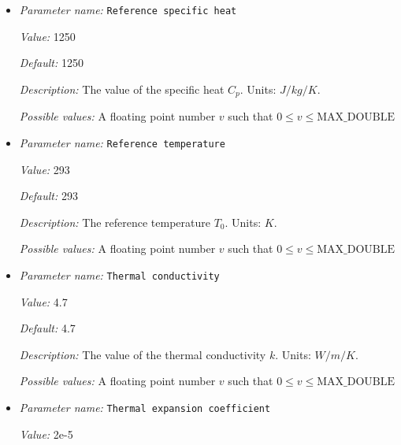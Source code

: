 \begin{itemize}
{\it Default:} 3300


{\it Description:} Reference density $\rho_0$. Units: $kg/m^3$.


{\it Possible values:} A floating point number $v$ such that $0 \leq v \leq \text{MAX\_DOUBLE}$
\item {\it Parameter name:} {\tt Reference specific heat}
\label{parameters:Material model/Composition reaction model/Reference specific heat}


{\it Value:} 1250


{\it Default:} 1250


{\it Description:} The value of the specific heat $C_p$. Units: $J/kg/K$.


{\it Possible values:} A floating point number $v$ such that $0 \leq v \leq \text{MAX\_DOUBLE}$
\item {\it Parameter name:} {\tt Reference temperature}
\label{parameters:Material model/Composition reaction model/Reference temperature}


{\it Value:} 293


{\it Default:} 293


{\it Description:} The reference temperature $T_0$. Units: $K$.


{\it Possible values:} A floating point number $v$ such that $0 \leq v \leq \text{MAX\_DOUBLE}$
\item {\it Parameter name:} {\tt Thermal conductivity}
\label{parameters:Material model/Composition reaction model/Thermal conductivity}


{\it Value:} 4.7


{\it Default:} 4.7


{\it Description:} The value of the thermal conductivity $k$. Units: $W/m/K$.


{\it Possible values:} A floating point number $v$ such that $0 \leq v \leq \text{MAX\_DOUBLE}$
\item {\it Parameter name:} {\tt Thermal expansion coefficient}
\label{parameters:Material model/Composition reaction model/Thermal expansion coefficient}


{\it Value:} 2e-5



\end{itemize}
